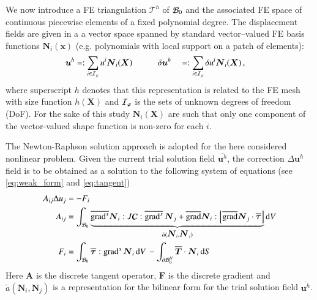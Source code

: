 \documentclass[preprint,12pt,times]{elsarticle}
\def\gz  #1{           \mbox{$\boldsymbol{#1}$}}
\def\grad {\mbox{grad}}
\def\d {\mbox{d}}
\def\mcl  #1{               {\cal #1}}
\begin{document}
We now introduce a FE triangulation $\mathcal{T}^h$ of $\mcl B_0$ and
the associated FE space of continuous piecewise elements of a fixed polynomial degree. %
The displacement fields are given in a
a vector space spanned by standard vector--valued FE basis functions $\gz N_i(\gz x)$ (e.g. polynomials with local support on a patch of elements):
\begin{alignat}{2}
       \gz u^h &=:  \sum_{i \in \mcl I_\varphi} u^i \gz N_i (\gz X) \quad \quad \quad
\delta \gz u^h &&=: \sum_{i \in \mcl I_\varphi} \delta u^i \gz N_i (\gz X) \,,
\end{alignat}
where superscript $h$ denotes that this representation is related to the FE mesh with size function $h(\gz X)$ and $\mcl I_\varphi$ is the sets of unknown degrees of freedom (DoF).
For the sake of this study $\gz N_i (\gz X)$ are such that only one component of the vector-valued shape function is non-zero for each $i$.

The Newton-Raphson solution approach is adopted for the here considered nonlinear problem.
Given the current trial solution field $\overline{\gz u^h}$, the correction $\Delta \gz u^h$ field is to be obtained as a solution to the following system of equations (see \eqref{eq:weak_form} and \eqref{eq:tangent})
\begin{align}
  A_{ij} \Delta u_j &= - F_i  \label{eq:linear_system} \\
  A_{ij} &=
  \int_{\mcl B_0}
  \underbrace{
  \overline{\grad^s} \gz N_i : J \boldsymbol{\mathcal{C}} : \overline{\grad^s} \, \gz N_j
  +
  \overline{\grad}\gz N_i :
  \left[
  \overline{\grad} \gz N_j \cdot
  \overline{\gz \tau}
  \right]
  }_{\tilde{a}(\gz N_i, \gz N_j)}
  \d V
  \label{eq:algebraic_tangent}
  \\
  F_i &=
  \int_{\mcl B_0} \overline{\gz \tau} : \grad^{s} \, \gz N_i \, \d V \,
  -
  \int_{\partial \mcl B_0^N} \overline{\gz T} \cdot \gz N_i \, \d S
\end{align}
Here $\gz A$ is the discrete tangent operator, $\gz F$ is the discrete gradient
and $\tilde{a}(\gz N_i, \gz N_j)$ is a representation for the bilinear form for the trial solution field $\overline{\gz u^h}$.
\end{document}
